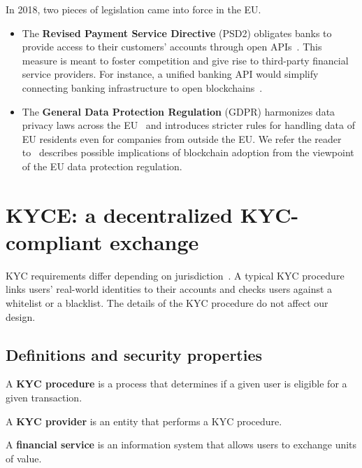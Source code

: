 In 2018, two pieces of legislation came into force in the EU.

\begin{itemize}
	\item The \textbf{Revised Payment Service Directive} (PSD2) obligates banks to provide access to their customers' accounts through open APIs~\cite{Hellstroem2017}.
	This measure is meant to foster competition and give rise to third-party financial service providers.
	For instance, a unified banking API would simplify connecting banking infrastructure to open blockchains~\cite{Elison2016}.
	\item The \textbf{General Data Protection Regulation} (GDPR) harmonizes data privacy laws across the EU~\cite{GDPR16} and introduces stricter rules for handling data of EU residents even for companies from outside the EU. We refer the reader to~\cite{Berberich2016} describes possible implications of blockchain adoption from the viewpoint of the EU data protection regulation.
\end{itemize}


\section{KYCE: a decentralized KYC-compliant exchange}

KYC requirements differ depending on jurisdiction~\cite{PWC2015}.
A typical KYC procedure links users' real-world identities to their accounts and checks users against a whitelist or a blacklist.
The details of the KYC procedure do not affect our design.

\subsection{Definitions and security properties}

\begin{definition}
	A \textbf{KYC procedure} is a process that determines if a given user is eligible for a given transaction.
\end{definition}

\begin{definition}
	A \textbf{KYC provider} is an entity that performs a KYC procedure.
\end{definition}

\begin{definition}
	A \textbf{financial service} is an information system that allows users to exchange units of value.
\end{definition}

